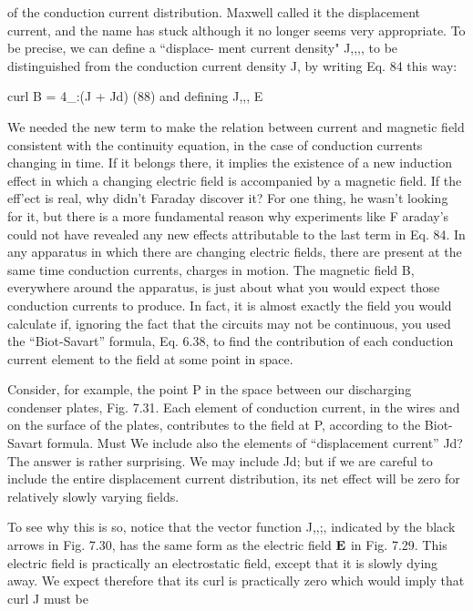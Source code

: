 of the conduction current distribution. Maxwell called it the displacement
current, and the name has stuck although it no longer
seems very appropriate. To be precise, we can define a ``displace-
ment current density" J,,,, to be distinguished from the conduction
current density J, by writing Eq. 84 this way:

\begin{equation}
\end{equation}
curl B = 4_:(J + Jd) (88)
and defining J,,, E 

We needed the new term to make the relation between current and
magnetic field consistent with the continuity equation, in the case
of conduction currents changing in time. If it belongs there, it
implies the existence of a new induction effect in which a changing
electric field is accompanied by a magnetic field. If the eff'ect is real,
why didn't Faraday discover it? For one thing, he wasn't looking
for it, but there is a more fundamental reason why experiments like
F araday's could not have revealed any new effects attributable to the
last term in Eq. 84. In any apparatus in which there are changing
electric fields, there are present at the same time conduction currents,
charges in motion. The magnetic field B, everywhere around the
apparatus, is just about what you would expect those conduction
currents to produce. In fact, it is almost exactly the field you would
calculate if, ignoring the fact that the circuits may not be continuous,
you used the ``Biot-Savart'' formula, Eq. 6.38, to find the contribution
of each conduction current element to the field at some point in space.

Consider, for example, the point P in the space between our discharging
condenser plates, Fig. 7.31. Each element of conduction
current, in the wires and on the surface of the plates, contributes to
the field at P, according to the Biot-Savart formula. Must We include
also the elements of ``displacement current'' Jd? The answer is rather
surprising. We may include Jd; but if we are careful to include the
entire displacement current distribution, its net effect will be zero for
relatively slowly varying fields.

To see why this is so, notice that the vector function J,,;, indicated
by the black arrows in Fig. 7.30, has the same form as the electric
field $\mathbf{E}$ in Fig. 7.29. This electric field is practically an electrostatic
field, except that it is slowly dying away. We expect therefore that
its curl is practically zero which would imply that curl J must be

